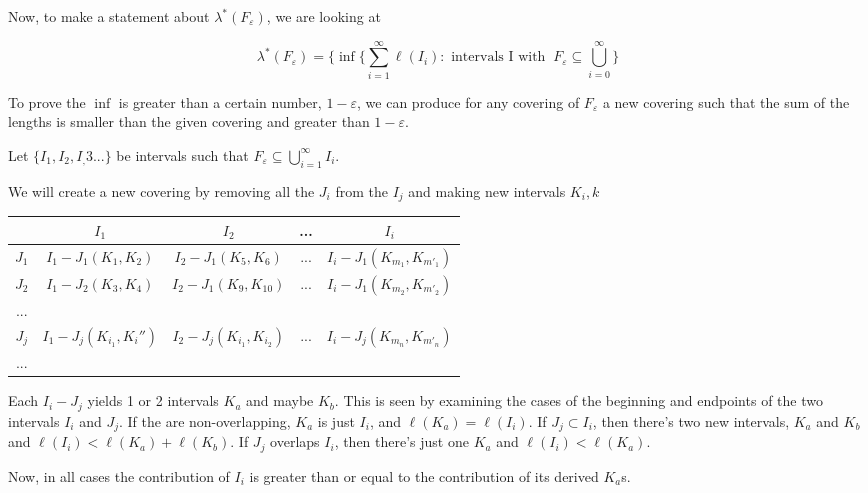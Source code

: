 \documentclass[11pt,oneside]{article}
\numberwithin{equation}{section}
\theoremstyle{definition}
\begin{document}
\begin{solution}
\begin{enumerate}[(a)]
      Now, to make a statement about $\lambda ^* (F _ \varepsilon)$, we are looking at

      $$
      \lambda ^ * (F_\varepsilon) = \{ \inf \{ \sum \limits _ { i = 1 } ^ \infty \ell ( I_i ) : \text { intervals I with } \ F_\varepsilon \subseteq \bigcup \limits _ { i = 0 } ^ \infty \}
      $$

      To prove the $\inf$ is greater than a certain number,
      $1-\varepsilon$, we can produce for any covering of
      $F_\varepsilon$ a new covering such that the sum of the lengths
      is smaller than the given covering and greater than $1 -
      \varepsilon$.
          
      Let $ \{ I_1, I_2, I_,3 ... \}$ be intervals such that
      $ F _ \varepsilon  \subseteq \bigcup \limits _ {i=1} ^ \infty I_i$.

      We will create a new covering by removing all the $J_i$ from the
      $I_j$ and making new intervals $K_i,k$

      \begin{tabular}{ |c|c|c|c|c|}
        \hline
        \   & $I_1$   & $I_2$ & ... & $I_i$ \\
        \hline
        $J_1$ & $I_1 - J_1 (K_1, K_2)$ & $I_2 - J_1 (K_5, K_6)$ & ... & $I_i - J_1 (K_{m_1}, K_{m'_1})$ \\
        $J_2$ & $I_1 - J_2 (K_3, K_4)$ & $I_2 - J_1 (K_9, K_{10})$ & ... & $I_i - J_1 (K_{m_2}, K_{m'_2})$ \\
        ... &       &   &  &  \\
        $J_j$ & $I_1 - J_j (K_{i_1}, K_i'')$ & $I_2 - J_j (K_{i_1}, K_{i_2})$ & ... & $ I_i - J_j (K_{m_n}, K_{m'_n})$ \\
        ... &       &   &  &  \\
        \hline
      \end{tabular}
      Each $I_i - J_j$ yields 1 or 2 intervals $K_a$ and maybe $K_b$.
      This is seen by examining the cases of the beginning and
      endpoints of the two intervals $I_i$ and $J_j$.  If the are
      non-overlapping, $K_a$ is just $I_i$, and $ \ell(K_a) =
      \ell(I_i)$.  If $J_j \subset I_i$, then there's two new
      intervals, $K_a$ and $K_b$ and $\ell (I_i) < \ell (K_a) + \ell
      (K_b)$.  If $J_j$ overlaps $I_i$, then there's just one $K_a$ and
      $ \ell (I_i) < \ell (K_a)$.

      Now, in all cases the contribution of $I_i$ is greater than or
      equal to the contribution of its derived $K_a$s.  


\end{enumerate}
\end{solution}
\end{document}

